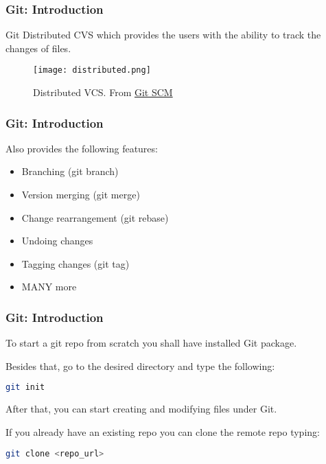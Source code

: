 \begin{frame}

\frametitle{Git: Introduction}

\begin{block}{Git}
Distributed CVS which provides the users with the ability to track the changes of files. 
\end{block}

\begin{figure}
\texttt{[image: distributed.png]}
\caption{Distributed VCS. From \href{https://git-scm.com/book/en/v2/Getting-Started-About-Version-Control}{Git SCM}}
\label{fig:distributed}
\end{figure}

\end{frame}

\begin{frame}

\frametitle{Git: Introduction}

Also provides the following features:
\begin{itemize}
\item Branching (git branch)
\item Version merging (git merge)
\item Change rearrangement (git rebase)
\item Undoing changes
\item Tagging changes (git tag)
\item MANY more
\end{itemize}

\end{frame}

\begin{frame}[fragile]

\frametitle{Git: Introduction}

To start a git repo from scratch you shall have installed Git package. 

Besides that, go to the desired directory and type the following:

\begin{lstlisting}[language=Bash]
git init
\end{lstlisting}

After that, you can start creating and modifying files under Git.

If you already have an existing repo you can clone the remote repo typing:

\begin{lstlisting}[language=Bash]
git clone <repo_url>
\end{lstlisting}

\end{frame}
